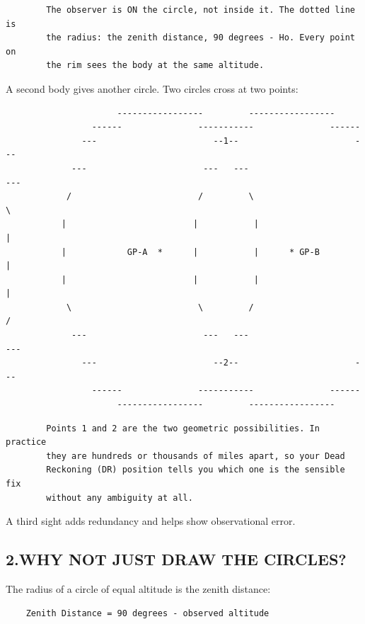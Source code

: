 \documentclass[11pt]{article}
\begin{document}
\begin{verbatim}
        The observer is ON the circle, not inside it. The dotted line is
        the radius: the zenith distance, 90 degrees - Ho. Every point on
        the rim sees the body at the same altitude.
\end{verbatim}

A second body gives another circle. Two circles cross at two points:

\begin{verbatim}
                      -----------------         -----------------
                 ------               -----------               ------
               ---                       --1--                       ---
             ---                       ---   ---                       ---
            /                         /         \                         \
           |                         |           |                         |
           |            GP-A  *      |           |      * GP-B             |
           |                         |           |                         |
            \                         \         /                         /
             ---                       ---   ---                       ---
               ---                       --2--                       ---
                 ------               -----------               ------
                      -----------------         -----------------
\end{verbatim}

\begin{verbatim}
        Points 1 and 2 are the two geometric possibilities. In practice
        they are hundreds or thousands of miles apart, so your Dead
        Reckoning (DR) position tells you which one is the sensible fix
        without any ambiguity at all.
\end{verbatim}

A third sight adds redundancy and helps show observational error.

\subsection*{2.\quad WHY NOT JUST DRAW THE CIRCLES?}

The radius of a circle of equal altitude is the zenith distance:

\begin{verbatim}
    Zenith Distance = 90 degrees - observed altitude
\end{verbatim}
\end{document}
